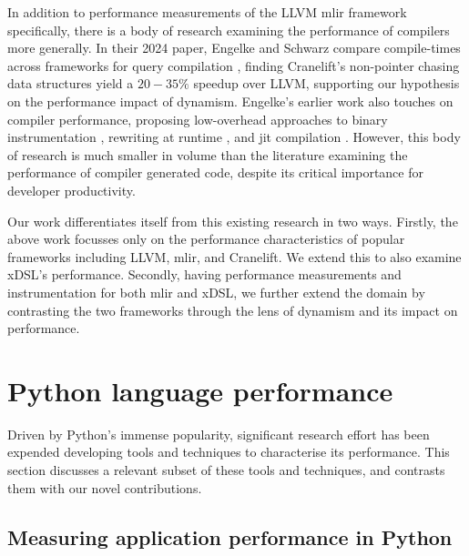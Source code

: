 In addition to performance measurements of the LLVM \ac{mlir} framework specifically, there is a body of research examining the performance of compilers more generally.
In their 2024 paper, Engelke and Schwarz compare compile-times across frameworks for query compilation \cite{engelkeCompileTimeAnalysisCompiler2024}, finding Cranelift's \cite{bytecodeallianceCranelift} non-pointer chasing data structures yield a $20-35\%$ speedup over LLVM, supporting our hypothesis on the performance impact of dynamism. Engelke's earlier work also touches on compiler performance, proposing low-overhead approaches to binary instrumentation \cite{engelkeInstrewLeveragingLLVM2020}, rewriting at runtime \cite{engelkeUsingLLVMOptimized2017}, and \ac{jit} compilation \cite{schwarzTPDEFastAdaptable2025} \cite{drescherFastTemplateBasedCode2024}.
However, this body of research is much smaller in volume than the literature examining the performance of compiler generated code, despite its critical importance for developer productivity.


Our work differentiates itself from this existing research in two ways.
Firstly, the above work focusses only on the performance characteristics of popular frameworks including LLVM, \ac{mlir}, and Cranelift. We extend this to also examine xDSL's performance.
Secondly, having performance measurements and instrumentation for both \ac{mlir} and xDSL, we further extend the domain by contrasting the two frameworks through the lens of dynamism and its impact on performance.




\section{Python language performance}
\label{sec:python-performance}

Driven by Python's immense popularity, significant research effort has been expended developing tools and techniques to characterise its performance.
This section discusses a relevant subset of these tools and techniques, and contrasts them with our novel contributions.


\subsection{Measuring application performance in Python}
\label{sec:python-performance-application}

